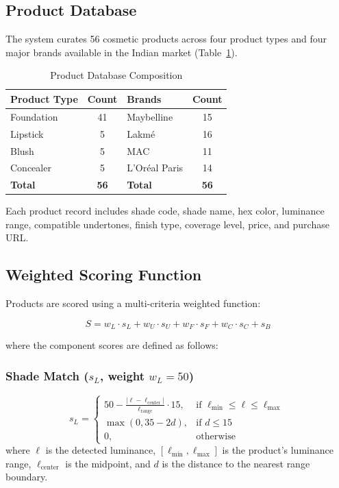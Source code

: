 \documentclass[conference]{IEEEtran}
\begin{document}
\subsection{Product Database}

The system curates 56 cosmetic products across four product types and four major brands available in the Indian market (Table~\ref{tab:product_db}).

\begin{table}[t]
\centering
\caption{Product Database Composition}
\label{tab:product_db}
\begin{tabular}{lclc}
\toprule
\textbf{Product Type} & \textbf{Count} & \textbf{Brands} & \textbf{Count} \\
\midrule
Foundation & 41 & Maybelline & 15 \\
Lipstick & 5 & Lakm\'{e} & 16 \\
Blush & 5 & MAC & 11 \\
Concealer & 5 & L'Or\'{e}al Paris & 14 \\
\midrule
\textbf{Total} & \textbf{56} & \textbf{Total} & \textbf{56} \\
\bottomrule
\end{tabular}
\end{table}

Each product record includes shade code, shade name, hex color, luminance range, compatible undertones, finish type, coverage level, price, and purchase URL.

\subsection{Weighted Scoring Function}

Products are scored using a multi-criteria weighted function:

\begin{equation}
S = w_L \cdot s_L + w_U \cdot s_U + w_F \cdot s_F + w_C \cdot s_C + s_B
\label{eq:scoring}
\end{equation}

where the component scores are defined as follows:

\subsubsection{Shade Match ($s_L$, weight $w_L = 50$)}
\begin{equation}
s_L = \begin{cases}
50 - \frac{|{\ell - \ell_{\text{center}}}|}{\ell_{\text{range}}} \cdot 15, & \text{if } \ell_{\min} \leq \ell \leq \ell_{\max} \\
\max(0, 35 - 2d), & \text{if } d \leq 15 \\
0, & \text{otherwise}
\end{cases}
\end{equation}
where $\ell$ is the detected luminance, $[\ell_{\min}, \ell_{\max}]$ is the product's luminance range, $\ell_{\text{center}}$ is the midpoint, and $d$ is the distance to the nearest range boundary.
\end{document}
